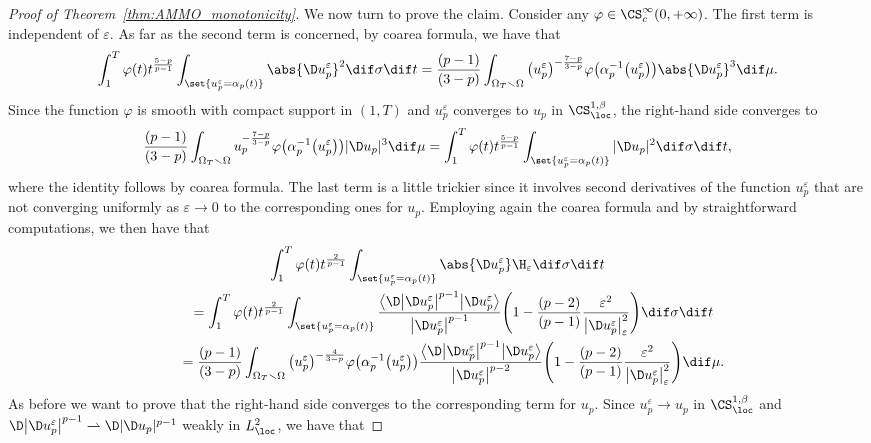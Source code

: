 \documentclass[10pt,a4paper]{amsart}
\numberwithin{equation}{section}
\begin{document}
\begin{proof}[Proof of Theorem~\ref{thm:AMMO_monotonicity}]
We now turn to prove the claim. Consider any $\varphi \in \CS^\infty_c(0,+\infty)$. The first term is independent of $\varepsilon$. As far as the second term is concerned, by coarea formula, we have that
\[
 \int_1^T\varphi(t)t^{\frac{5-p}{p-1}} \int_{\set{u_p^\varepsilon=\alpha_p(t)}} \abs{\D u^\varepsilon_p}^2 \dif \sigma \dif t = \frac{(p-1)}{(3-p)} \int_{\Omega_T \smallsetminus \Omega} \big(u^\varepsilon_p\big)^{-\frac{7-p}{3-p}}\varphi \big(\alpha_p^{-1}\big(u^\varepsilon_p\big)\big) \abs{ \D u_p^\varepsilon}^3 \dif \mu.
\]
Since the function $\varphi$ is smooth with compact support in $(1,T)$ and $u_p^\varepsilon$ converges to $u_p$ in $\CS^{1,\beta}_{\loc}$, the right-hand side converges to
\[
 \frac{(p-1)}{(3-p)} \int_{\Omega_T \smallsetminus \Omega} u_p^{-\frac{7-p}{3-p}}\varphi \big(\alpha_p^{-1}\big(u^\varepsilon_p\big)\big)| \D u_p |^3 \dif \mu = \int_1^T \varphi(t)t^{\frac{5-p}{p-1}} \int_{\set{u_p^\varepsilon=\alpha_p(t)}} |\D u_p |^2 \dif \sigma \dif t,
\]
where the identity follows by coarea formula. The last term is a little trickier since it involves second derivatives of the function $u_p^\varepsilon$ that are not converging uniformly as $\varepsilon \to 0$ to the corresponding ones for $u_p$. Employing again the coarea formula and by straightforward computations, we then have that
\begin{gather*}
 \int_1^T\varphi(t)t^{\frac{2}{p-1}} \int_{\set{u_p^\varepsilon=\alpha_p(t)}} \abs{\D u^\varepsilon_p} \H_\varepsilon\dif \sigma \dif t \\
 \qquad {}=
 \int_1^T\varphi(t)t^{\frac{2}{p-1}} \int_{\set{u_p^\varepsilon=\alpha_p(t)}} \frac{\big\langle \D \big| \D u^\varepsilon_p\big|^{p-1}\big|\D u^\varepsilon_p\big\rangle}{\big| \D u_p^\varepsilon\big|^{p-1} }\Bigg( 1 - \frac{(p-2)}{(p-1)} \frac{ \varepsilon^2}{\big|\D u^\varepsilon_p\big|_\varepsilon^2}\Bigg)\dif \sigma \dif t\\
 \qquad {}=\frac{(p-1)}{(3-p)} \int_{\Omega_T \smallsetminus \Omega} \big(u^\varepsilon_p\big)^{-\frac{4}{3-p}}\varphi \big(\alpha_p^{-1}\big(u^\varepsilon_p\big)\big)\frac{\big\langle\D \big| \D u^\varepsilon_p\big|^{p-1}\big|\D u^\varepsilon_p\big\rangle}{\big| \D u_p^\varepsilon\big|^{p-2} }\Bigg( 1 - \frac{(p-2)}{(p-1)} \frac{ \varepsilon^2}{\big|\D u^\varepsilon_p\big|_\varepsilon^2}\Bigg) \dif \mu.
\end{gather*}
As before we want to prove that the right-hand side converges to the corresponding term for $u_p$. Since $u^\varepsilon_p\to u_p$ in $\CS^{1, \beta}_{\loc}$ and $\D\big| \D u^\varepsilon_p\big|^{p-1}\rightharpoonup \D| \D u_p |^{p-1} $ weakly in $L^2_{\loc}$, we have that

\end{proof}
\end{document}
